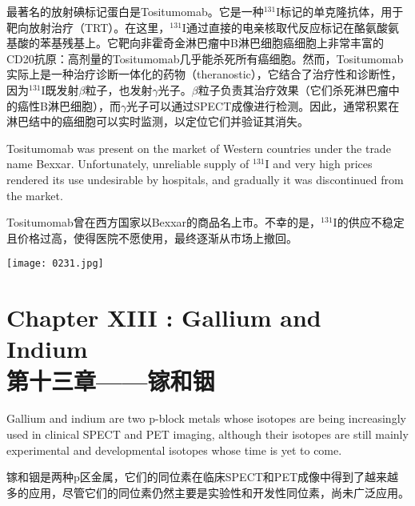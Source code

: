 \documentclass[dvipsnames, svgnames,a4paper,11pt]{article}
\begin{document}
最著名的放射碘标记蛋白是Tositumomab。它是一种\(\mathrm{^{131}I}\)标记的单克隆抗体，用于靶向放射治疗（TRT）。在这里，\(\mathrm{^{131}I}\)通过直接的电亲核取代反应标记在酪氨酸氨基酸的苯基残基上。它靶向非霍奇金淋巴瘤中B淋巴细胞癌细胞上非常丰富的CD20抗原：高剂量的Tositumomab几乎能杀死所有癌细胞。然而，Tositumomab实际上是一种治疗诊断一体化的药物（theranostic），它结合了治疗性和诊断性，因为\(\mathrm{^{131}I}\)既发射\(\beta\)粒子，也发射$\gamma$光子。\(\beta\)粒子负责其治疗效果（它们杀死淋巴瘤中的癌性B淋巴细胞），而$\gamma$光子可以通过SPECT成像进行检测。因此，通常积累在淋巴结中的癌细胞可以实时监测，以定位它们并验证其消失。

Tositumomab was present on the market of Western countries under the trade name Bexxar. Unfortunately, unreliable supply of \(\mathrm{^{131}I}\) and very high prices rendered its use undesirable by hospitals, and gradually it was discontinued from the market.

Tositumomab曾在西方国家以Bexxar的商品名上市。不幸的是，\(\mathrm{^{131}I}\)的供应不稳定且价格过高，使得医院不愿使用，最终逐渐从市场上撤回。

\begin{figure*}[h]
	\centering
    \texttt{[image: 0231.jpg]}  
\end{figure*}

\newpage



\section{Chapter XIII :  Gallium and Indium \\第十三章——镓和铟}

Gallium and indium are two p-block metals whose isotopes are being increasingly used in clinical SPECT and PET imaging, although their isotopes are still mainly experimental and developmental isotopes whose time is yet to come.

镓和铟是两种p区金属，它们的同位素在临床SPECT和PET成像中得到了越来越多的应用，尽管它们的同位素仍然主要是实验性和开发性同位素，尚未广泛应用。
\end{document}
